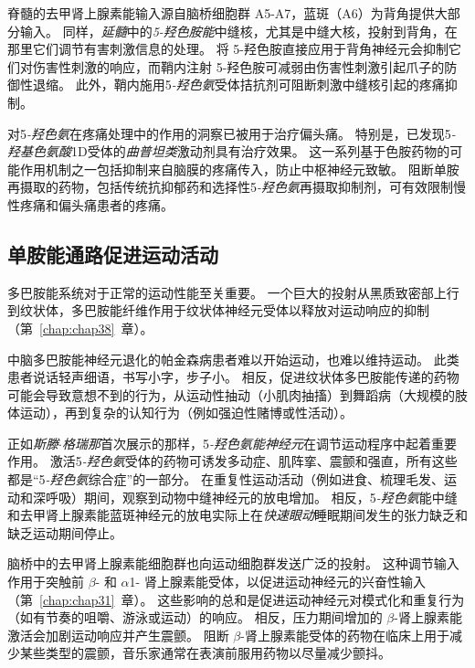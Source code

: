 脊髓的去甲肾上腺素能输入源自脑桥细胞群 A5-A7，蓝斑（A6）为背角提供大部分输入。
同样，\textit{延髓}中的\textit{5-羟色胺能}中缝核，尤其是中缝大核，投射到背角，在那里它们调节有害刺激信息的处理。
将 5-羟色胺直接应用于背角神经元会抑制它们对伤害性刺激的响应，而鞘内注射 5-羟色胺可减弱由伤害性刺激引起爪子的防御性退缩。
此外，鞘内施用5\textit{-羟色氨}受体拮抗剂可阻断刺激中缝核引起的疼痛抑制。


对5\textit{-羟色氨}在疼痛处理中的作用的洞察已被用于治疗偏头痛。
特别是，已发现5\textit{-羟基色氨酸}1D受体的\textit{曲普坦类}激动剂具有治疗效果。
这一系列基于色胺药物的可能作用机制之一包括抑制来自脑膜的疼痛传入，防止中枢神经元致敏。
阻断单胺再摄取的药物，包括传统抗抑郁药和选择性5\textit{-羟色氨}再摄取抑制剂，可有效限制慢性疼痛和偏头痛患者的疼痛。



\subsection{单胺能通路促进运动活动}

多巴胺能系统对于正常的运动性能至关重要。
一个巨大的投射从黑质致密部上行到纹状体，多巴胺能纤维作用于纹状体神经元受体以释放对运动响应的抑制（第~\ref{chap:chap38}~章）。


中脑多巴胺能神经元退化的帕金森病患者难以开始运动，也难以维持运动。
此类患者说话轻声细语，书写小字，步子小。
相反，促进纹状体多巴胺能传递的药物可能会导致意想不到的行为，从运动性抽动（小肌肉抽搐）到舞蹈病（大规模的肢体运动），再到复杂的认知行为（例如强迫性赌博或性活动）。


正如\textit{斯滕$\cdot$格瑞那}首次展示的那样，5\textit{-羟色氨能神经元}在调节运动程序中起着重要作用。
激活5\textit{-羟色氨}受体的药物可诱发多动症、肌阵挛、震颤和强直，所有这些都是“5\textit{-羟色氨}综合症”的一部分。
在重复性运动活动（例如进食、梳理毛发、运动和深呼吸）期间，观察到动物中缝神经元的放电增加。
相反，5\textit{-羟色氨}能中缝和去甲肾上腺素能蓝斑神经元的放电实际上在\textit{快速眼动}睡眠期间发生的张力缺乏和缺乏运动期间停止。


脑桥中的去甲肾上腺素能细胞群也向运动细胞群发送广泛的投射。
这种调节输入作用于突触前 $\beta$- 和 $\alpha$1- 肾上腺素能受体，以促进运动神经元的兴奋性输入（第~\ref{chap:chap31}~章）。
这些影响的总和是促进运动神经元对模式化和重复行为（如有节奏的咀嚼、游泳或运动）的响应。
相反，压力期间增加的 $\beta$-肾上腺素能激活会加剧运动响应并产生震颤。
阻断 $\beta$-肾上腺素能受体的药物在临床上用于减少某些类型的震颤，音乐家通常在表演前服用药物以尽量减少颤抖。



